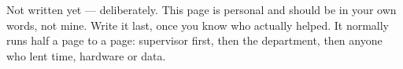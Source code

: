 
\begin{draftnote}
Not written yet --- deliberately. This page is personal and should be in your own words, not
mine. Write it last, once you know who actually helped. It normally runs half a page to a page:
supervisor first, then the department, then anyone who lent time, hardware or data.
\end{draftnote}

\clearpage
